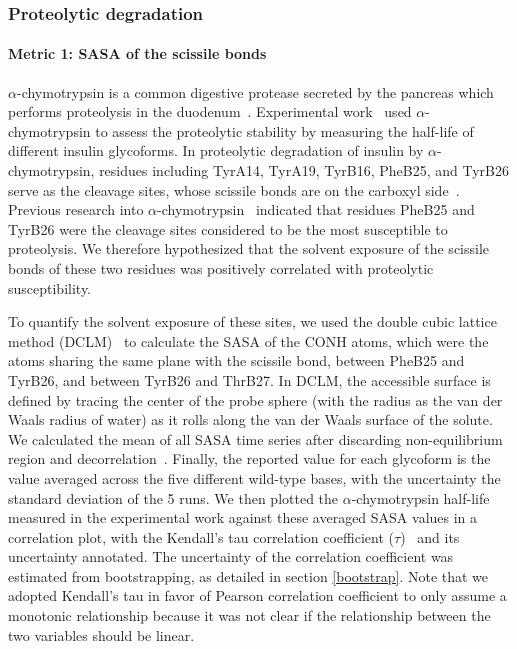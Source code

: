 \documentclass[sn-vancouver]{sn-jnl}
\begin{document}
\subsubsection{Proteolytic degradation}
\paragraph{Metric 1: SASA of the scissile bonds}
$\alpha$-chymotrypsin is a common digestive protease secreted by the pancreas which performs proteolysis in the duodenum~\cite{wilcox19705}. Experimental work~\cite{guan2018chemically} used $\alpha$-chymotrypsin to assess the proteolytic stability by measuring the half-life of different insulin glycoforms. In proteolytic degradation of insulin by $\alpha$-chymotrypsin, residues including TyrA14, TyrA19, TyrB16, PheB25, and TyrB26 serve as the cleavage sites, whose scissile bonds are on the carboxyl side~\cite{schilling1991degradation}. Previous research into $\alpha$-chymotrypsin~\cite{schilling1991degradation} indicated that residues PheB25 and TyrB26 were the cleavage sites considered to be the most susceptible to proteolysis. We therefore hypothesized that the solvent exposure of the scissile bonds of these two residues was positively correlated with proteolytic susceptibility. 

To quantify the solvent exposure of these sites, we used the double cubic lattice method (DCLM)~\cite{eisenhaber1995double} to calculate the SASA of the CONH atoms, which were the atoms sharing the same plane with the scissile bond, between PheB25 and TyrB26, and between TyrB26 and ThrB27. In DCLM, the accessible surface is defined by tracing the center of the probe sphere (with the radius as the van der Waals radius of water) as it rolls along the van der Waals surface of the solute.  We calculated the mean of all SASA time series after discarding non-equilibrium region and decorrelation~\cite{chodera2016simple}. Finally, the reported value for each glycoform is the value averaged across the five different wild-type bases, with the uncertainty the standard deviation of the 5 runs. We then plotted the $\alpha$-chymotrypsin half-life measured in the experimental work against these averaged SASA values in a correlation plot, with the Kendall's tau correlation coefficient ($\tau$)~\cite{kendall1948advanced} and its uncertainty annotated. The uncertainty of the correlation coefficient was estimated from bootstrapping, as detailed in section \ref{bootstrap}. Note that we adopted Kendall's tau in favor of Pearson correlation coefficient to only assume a monotonic relationship because it was not clear if the relationship between the two variables should be linear.
\end{document}
